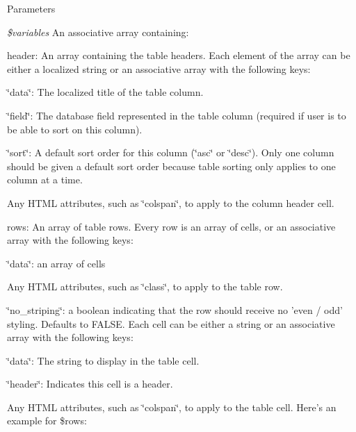 \begin{DoxyParams}{Parameters}
\item[{\em \$variables}]An associative array containing:
\begin{DoxyItemize}
\item header: An array containing the table headers. Each element of the array can be either a localized string or an associative array with the following keys:
\begin{DoxyItemize}
\item \char`\"{}data\char`\"{}: The localized title of the table column.
\item \char`\"{}field\char`\"{}: The database field represented in the table column (required if user is to be able to sort on this column).
\item \char`\"{}sort\char`\"{}: A default sort order for this column (\char`\"{}asc\char`\"{} or \char`\"{}desc\char`\"{}). Only one column should be given a default sort order because table sorting only applies to one column at a time.
\item Any HTML attributes, such as \char`\"{}colspan\char`\"{}, to apply to the column header cell.
\end{DoxyItemize}
\item rows: An array of table rows. Every row is an array of cells, or an associative array with the following keys:
\begin{DoxyItemize}
\item \char`\"{}data\char`\"{}: an array of cells
\item Any HTML attributes, such as \char`\"{}class\char`\"{}, to apply to the table row.
\item \char`\"{}no\_\-striping\char`\"{}: a boolean indicating that the row should receive no 'even / odd' styling. Defaults to FALSE. Each cell can be either a string or an associative array with the following keys:
\item \char`\"{}data\char`\"{}: The string to display in the table cell.
\item \char`\"{}header\char`\"{}: Indicates this cell is a header.
\item Any HTML attributes, such as \char`\"{}colspan\char`\"{}, to apply to the table cell. Here's an example for \$rows: 


\end{DoxyItemize}
\end{DoxyItemize}
\end{DoxyParams}
